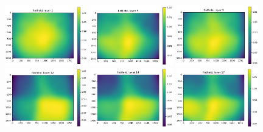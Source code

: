 \documentclass[letterpaper,11pt]{article}
\begin{document}
\begin{figure}[!ht]
\centering
\includegraphics[width=0.32\textwidth]{images/methods/flatfield_layers_polaris/flatfield_layer_1}
\includegraphics[width=0.32\textwidth]{images/methods/flatfield_layers_polaris/flatfield_layer_5}
\includegraphics[width=0.32\textwidth]{images/methods/flatfield_layers_polaris/flatfield_layer_9}
\includegraphics[width=0.32\textwidth]{images/methods/flatfield_layers_polaris/flatfield_layer_12}
\includegraphics[width=0.32\textwidth]{images/methods/flatfield_layers_polaris/flatfield_layer_14}
\includegraphics[width=0.32\textwidth]{images/methods/flatfield_layers_polaris/flatfield_layer_17}

\end{figure}
\end{document}
